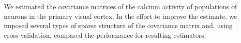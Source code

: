 We estimated the covariance matrices of the calcium activity of populations of neurons in the primary visual cortex.  
In the effort to improve the estimate, we imposed several types of sparse structure of the covariance matrix and, using cross-validation, compared the performance for resulting estimators.  